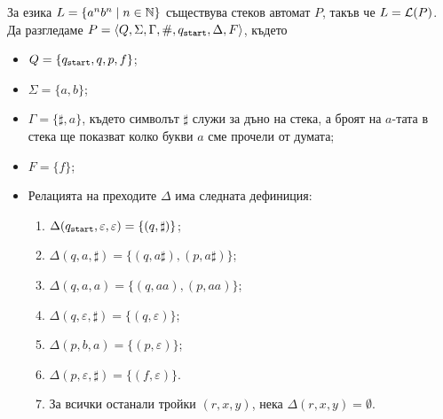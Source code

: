 \begin{example}
  \label{ex:anbn}
  За езика $L = \{a^nb^n\mid n\in\mathbb{N}\}$ съществува стеков автомат $P$, такъв че
  $L = \mathcal{L}(P)$.
  Да разгледаме $P = \langle{Q,\Sigma,\Gamma,\#,q_{\texttt{start}},\Delta,F}\rangle$, където
  \begin{itemize}
  \item
    $Q = \{q_{\texttt{start}},q,p,f\}$;
  \item
    $\Sigma = \{a,b\}$;
  \item
    $\Gamma = \{\sharp,a\}$, където символът $\sharp$ служи за дъно на стека, а броят на $a$-тата в стека ще показват колко букви $a$ сме прочели от думата;
  \item
    $F = \{f\}$;
  \item
    Релацията на преходите $\Delta$ има следната дефиниция:
    \begin{enumerate}[(1)]
    \item
      $\Delta(q_{\texttt{start}},\varepsilon,\varepsilon) = \{(q,\sharp)\}$;
    \item
      $\Delta(q,a,\sharp) = \{(q, a\sharp), (p, a\sharp)\}$;
    \item
      $\Delta(q,a,a) = \{(q, aa), (p, aa)\}$;
    \item 
      $\Delta(q,\varepsilon,\sharp) = \{(q,\varepsilon)\}$;
    \item 
      $\Delta(p, b, a) = \{(p,\varepsilon)\}$;
    \item
      $\Delta(p, \varepsilon, \sharp) = \{(f, \varepsilon)\}$.
    \item
      За всички останали тройки $(r,x,y)$, нека $\Delta(r,x,y) = \emptyset$.
    \end{enumerate}
  \end{itemize}
  

\end{example}
